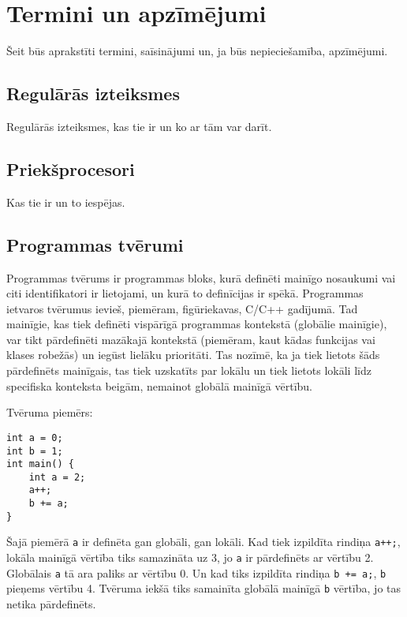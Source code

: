 \section {Termini un apzīmējumi}
Šeit būs aprakstīti termini, saīsinājumi un, ja būs nepieciešamība, apzīmējumi.

\subsection{Regulārās izteiksmes}
Regulārās izteiksmes, kas tie ir un ko ar tām var darīt.

\subsection{Priekšprocesori}
Kas tie ir un to iespējas.

\subsection{Programmas tvērumi}

Programmas tvērums ir programmas bloks, kurā definēti mainīgo nosaukumi vai citi identifikatori ir lietojami, un kurā to definīcijas ir spēkā. Programmas ietvaros tvērumus ievieš, piemēram, figūriekavas, C/C++ gadījumā. Tad mainīgie, kas tiek definēti vispārīgā programmas kontekstā (globālie mainīgie), var tikt pārdefinēti mazākajā kontekstā (piemēram, kaut kādas funkcijas vai klases robežās) un iegūst lielāku prioritāti. Tas nozīmē, ka ja tiek lietots šāds pārdefinēts mainīgais, tas tiek uzskatīts par lokālu un tiek lietots lokāli līdz specifiska konteksta beigām, nemainot globālā mainīgā vērtību.

Tvēruma piemērs:
\begin{verbatim}
int a = 0;
int b = 1;
int main() {
    int a = 2;
    a++;
    b += a;
}
\end{verbatim}
Šajā piemērā \verb|a| ir definēta gan globāli, gan lokāli. Kad tiek izpildīta rindiņa \verb|a++;|, lokāla mainīgā vērtība tiks samazināta uz 3, jo \verb|a| ir pārdefinēts ar vērtību 2. Globālais \verb|a| tā ara paliks ar vērtību 0. Un kad tiks izpildīta rindiņa \verb|b += a;|, \verb|b| pieņems vērtību 4. Tvēruma iekšā tiks samainīta globālā mainīgā \verb|b| vērtība, jo tas netika pārdefinēts.
